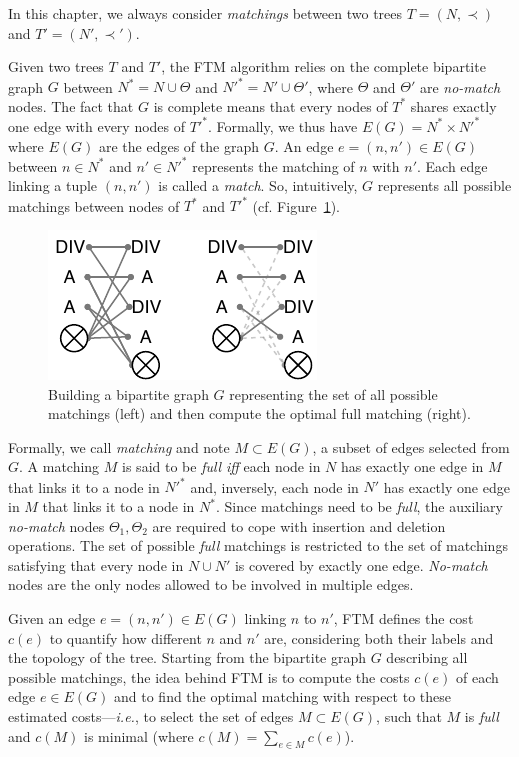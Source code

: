 In this chapter, we always consider \emph{matchings} between two trees $T=(N,\prec)$ and $T'=(N',\prec')$.

Given two trees $T$ and $T'$, the FTM algorithm relies on the complete bipartite graph $G$ between $N^* = N\cup{\Theta}$ and $N'^* = N'\cup{\Theta}'$, where $\Theta$ and $\Theta'$ are \textit{no-match} nodes.
The fact that $G$ is complete means that every nodes of $T^*$ shares exactly one edge with every nodes of $T'^*$.
Formally, we thus have $E(G) = N^* \times N'^*$ where $E(G)$ are the edges of the graph $G$.
An edge $e=(n, n') \in E(G)$ between $n\in N^*$ and $n'\in N'^*$ represents the matching of $n$ with $n'$. Each edge linking a tuple $(n, n')$ is called a \textit{match}.
So, intuitively, $G$ represents all possible matchings between nodes of $T^*$ and $T'^*$ (cf. Figure~\ref{fig:g_SFTM}).

\begin{figure}
    \centering 
    \includegraphics[width=.5\textwidth]{tree-matching/explanation/g_ftm}
    \caption{Building a bipartite graph $G$ representing the set of all possible matchings (left) and then compute the optimal full matching (right).}
    \label{fig:g_SFTM}%
\end{figure}

Formally, we call \textit{matching} and note $M\subset E(G)$, a subset of edges selected from $G$.
A matching $M$ is said to be \textit{full} \emph{iff} each node in $N$ has exactly one edge in $M$ that links it to a node in $N'^*$ and, inversely, each node in $N'$ has exactly one edge in $M$ that links it to a node in $N^*$.
Since matchings need to be \textit{full}, the auxiliary \textit{no-match} nodes $\Theta_1, \Theta_2$ are required to cope with insertion and deletion operations.
The set of possible \textit{full} matchings is restricted to the set of matchings satisfying that every node in $N \cup N'$ is covered by exactly one edge.
\emph{No-match} nodes are the only nodes allowed to be involved in multiple edges.

Given an edge $e=(n, n')\in E(G)$ linking $n$ to $n'$, FTM defines the cost $c(e)$ to quantify how different $n$ and $n'$ are, considering both their labels and the topology of the tree.
Starting from the bipartite graph $G$ describing all possible matchings, the idea behind FTM is to compute the costs $c(e)$ of each edge $e\in E(G)$ and to find the optimal matching with respect to these estimated costs---\emph{i.e.}, to select the set of edges $M\subset E(G)$, such that $M$ is \textit{full} and $c(M)$ is minimal (where $c(M) = \sum_{e\in M}c(e)$).

